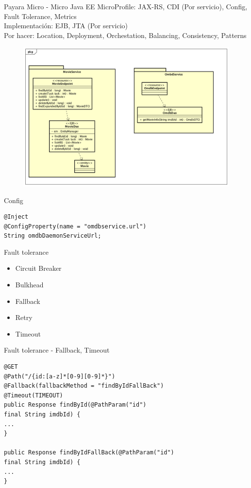 \documentclass{beamer}
\begin{document}
\begin{frame}{Payara Micro - Micro Java EE}
\footnotesize MicroProfile: JAX-RS, CDI (Por servicio), Config, Fault Tolerance, Metrics\\
Implementación: EJB, JTA (Por servicio)\\
Por hacer: Location, Deployment, Orchestation, Balancing, Consistency, Patterns
\begin{figure}
\centering
\includegraphics[width=0.95\linewidth]{Images/demomicro}
\end{figure}

\end{frame}

\begin{frame}[fragile]{Config}
\begin{lstlisting}
@Inject
@ConfigProperty(name = "omdbservice.url")
String omdbDaemonServiceUrl;
\end{lstlisting}
\end{frame}

\begin{frame}{Fault tolerance}

\begin{itemize}
\item Circuit Breaker
\item Bulkhead
\item Fallback
\item Retry
\item Timeout
\end{itemize}

\end{frame}


\begin{frame}[fragile]{Fault tolerance - Fallback, Timeout}
\begin{lstlisting}
@GET
@Path("/{id:[a-z]*[0-9][0-9]*}")
@Fallback(fallbackMethod = "findByIdFallBack")
@Timeout(TIMEOUT)
public Response findById(@PathParam("id") 
final String imdbId) {
...
}

public Response findByIdFallBack(@PathParam("id") 
final String imdbId) {
...
}
\end{lstlisting}
\end{frame}
\end{document}
